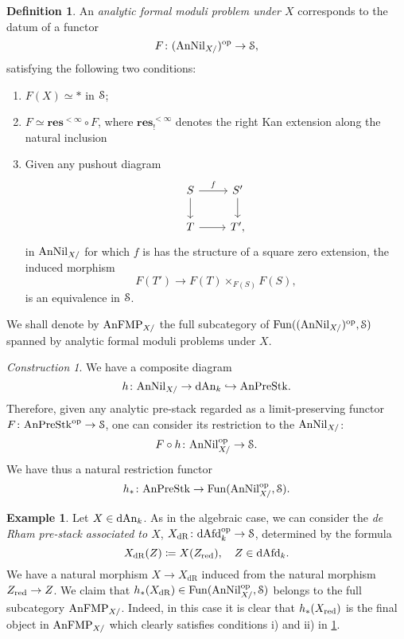 \documentclass[10pt,a4paper,reqno]{amsart} %
\theoremstyle{plain}
\theoremstyle{definition}
\newtheorem{defin}[thm]{Definition}
\newtheorem{eg}[thm]{Example}
\theoremstyle{remark}
\numberwithin{equation}{section}
\newtheorem{construction}[thm]{Construction}
\begin{document}
\begin{defin} \label{defin:analytic_formal_moduli_problems_under}
    An \emph{analytic formal moduli problem under $X$} corresponds to the datum of a functor
        \[F \colon (\mathrm{AnNil}_{X/})^\mathrm{op} \to \mathcal S,\]
    satisfying the following two conditions:
    \begin{enumerate}
        \item $F(X) \simeq *$ in $\mathcal S$;
        \item $F \simeq \mathbf{res}^{< \infty} \circ F$, where $\mathbf{res}^{< \infty}_!$ denotes the right Kan extension along the natural inclusion
        \item Given any pushout diagram
            \[\begin{tikzcd}
                S \ar{r}{f} \ar{d} & S' \ar{d} \\
                T \ar{r} & T',
            \end{tikzcd}\]
        in $\mathrm{AnNil}_{X/}$ for which $f$ is has the structure of a square zero extension, the induced morphism
            \[F(T') \to F(T) \times_{F(S)}F(S),\]
        is an equivalence in $\mathcal S$.
    \end{enumerate}
    We shall denote by $\mathrm{AnFMP}_{X/}$ the full subcategory of $\operatorname{Fun}((\mathrm{AnNil}_{X/ })^\mathrm{op}, \mathcal S)$ spanned by analytic formal moduli problems
    under $X$.
\end{defin}

\begin{construction}
We have a composite diagram
    \[
        h \colon \mathrm{AnNil}_{X/} \to \mathrm{dAn}_k \hookrightarrow \mathrm{AnPreStk}.
    \]
Therefore, given any analytic pre-stack regarded as a limit-preserving functor $F \colon \mathrm{AnPreStk}^\mathrm{op} \to \mathcal S$, one can consider its restriction to the \infcat
$\mathrm{AnNil}_{X/}$:
    \[
        F \circ h \colon \mathrm{AnNil}_{X/} ^\mathrm{op} \to \mathcal S.      
    \]
We have thus a natural restriction functor
    \[
        h_* \colon \mathrm{AnPreStk} \to \operatorname{Fun}(\mathrm{AnNil}_{X/} ^\mathrm{op}, \mathcal S).  
    \]
\end{construction}


\begin{eg}
    Let $X \in \mathrm{dAn}_k$. As in the algebraic case, we can consider the \emph{de Rham pre-stack associated to $X$}, $X_\mathrm{dR} \colon \mathrm{dAfd}_k^\mathrm{op} \to \mathcal S$,
    determined by the formula
        \[
            X_{\mathrm{dR}}(Z) \coloneqq X(Z_{\mathrm{red}}), \quad Z \in \mathrm{dAfd}_k.  
        \]
    We have a natural morphism $X \to X_\mathrm{dR}$ induced from the natural morphism $Z_{\mathrm{red}} \to Z$.
    We claim that $h_*(X_\mathrm{dR}) \in \operatorname{Fun}(\mathrm{AnNil}_{X/}^\mathrm{op}, \mathcal S)$ belongs to the full subcategory $\mathrm{AnFMP}_{X/}$. Indeed, in this case it is clear that
    $h_*(X_{\mathrm{red}})$ is the final object in $\mathrm{AnFMP}_{X/}$ which clearly satisfies conditions i) and ii) in \cref{defin:analytic_formal_moduli_problems_under}.
\end{eg}
\end{document}
